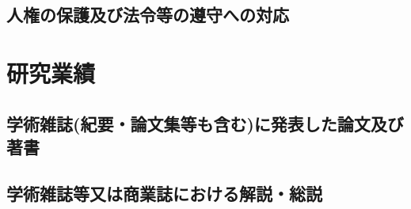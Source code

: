 \documentclass[11pt,a4paper,twoside]{jarticle}
\newcommand{\研究課題名}{Symmetry breaking operators}
\newcommand{\研究機関名}{東京大学}
\newcommand{\申請者氏名}{レオンチエフ\,オレクシィ}
\newcommand{\研究代表者氏名}{\申請者氏名}
\newcommand{\研究期間の最終元号年度}{31}	%
\begin{document}
\subsection{人権の保護及び法令等の遵守への対応}
\newcommand{\人権の保護及び法令等の遵守への対応}{%
	該当なし。
}

\section{研究業績}
\subsection{学術雑誌(紀要・論文集等も含む)に発表した論文及び著書}
\newcommand{\学術雑誌等に発表した論文または著書}{%
	
	\begin{enumerate}
		\item[](査読有り)%
		\item \underline{O. Leontiev}, P. Feketa,
			``A new criterion for the roughness of exponential dichotomy on $\mathbb{R}$'',
				Miskolc Mathematical Notes, 16(2), pp. 987--994, 2015.

		\item[](査読なし)%
			
			なし
	\end{enumerate}
}

\subsection{学術雑誌等又は商業誌における解説・総説}
\newcommand{\学術雑誌等または商業誌における解説や総説}{%

	なし
}
\end{document}
